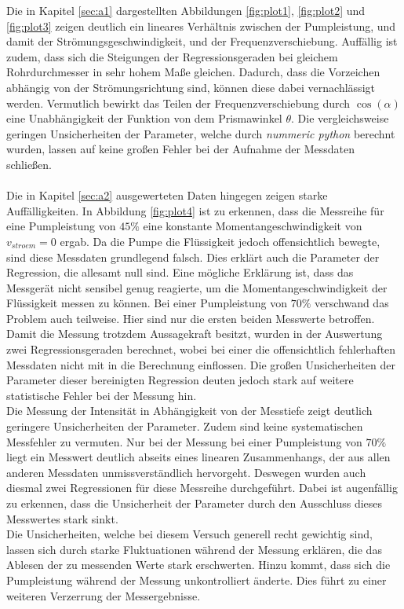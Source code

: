 Die in Kapitel \ref{sec:a1} dargestellten Abbildungen \ref{fig:plot1}, \ref{fig:plot2} und \ref{fig:plot3} zeigen deutlich ein lineares Verhältnis
zwischen der Pumpleistung, und damit der Strömungsgeschwindigkeit, und der Frequenzverschiebung. Auffällig ist zudem, dass sich die Steigungen der
Regressionsgeraden bei gleichem Rohrdurchmesser in sehr hohem Maße gleichen. Dadurch, dass die Vorzeichen abhängig von der Strömungsrichtung sind,
können diese dabei vernachlässigt werden. Vermutlich bewirkt das Teilen der Frequenzverschiebung durch $\cos(\alpha)$ eine Unabhängigkeit der
Funktion von dem Prismawinkel $\theta$. Die vergleichsweise geringen Unsicherheiten der Parameter, welche durch \textit{nummeric python} \cite{numpy}
berechnt wurden, lassen auf keine großen Fehler bei der Aufnahme der Messdaten schließen.
\\\\\noindent
Die in Kapitel \ref{sec:a2} ausgewerteten Daten hingegen zeigen starke Auffälligkeiten. In Abbildung \ref{fig:plot4} ist zu erkennen, dass die
Messreihe für eine Pumpleistung von $45\%$ eine konstante Momentangeschwindigkeit von $v_{stroem}=0$ ergab. Da die Pumpe die Flüssigkeit jedoch
offensichtlich bewegte, sind diese Messdaten grundlegend falsch. Dies erklärt auch die Parameter der Regression, die allesamt null sind. Eine
mögliche Erklärung ist, dass das Messgerät nicht sensibel genug reagierte, um die Momentangeschwindigkeit der Flüssigkeit messen zu können.
Bei einer Pumpleistung von $70\%$ verschwand das Problem auch teilweise. Hier sind nur die ersten beiden Messwerte betroffen. Damit die
Messung trotzdem Aussagekraft besitzt, wurden in der Auswertung zwei Regressionsgeraden berechnet, wobei bei einer die offensichtlich fehlerhaften
Messdaten nicht mit in die Berechnung einflossen. Die großen Unsicherheiten der Parameter dieser bereinigten Regression deuten jedoch stark auf
weitere statistische Fehler bei der Messung hin.
\\\noindent
Die Messung der Intensität in Abhängigkeit von der Messtiefe zeigt deutlich geringere Unsicherheiten der Parameter. Zudem sind keine systematischen
Messfehler zu vermuten. Nur bei der Messung bei einer Pumpleistung von $70\%$ liegt ein Messwert deutlich abseits eines linearen Zusammenhangs, der
aus allen anderen Messdaten unmissverständlich hervorgeht. Deswegen wurden auch diesmal zwei Regressionen für diese Messreihe durchgeführt. Dabei
ist augenfällig zu erkennen, dass die Unsicherheit der Parameter durch den Ausschluss dieses Messwertes stark sinkt.
\\\noindent
Die Unsicherheiten, welche bei diesem Versuch generell recht gewichtig sind, lassen sich durch starke Fluktuationen während der Messung erklären,
die das Ablesen der zu messenden Werte stark erschwerten. Hinzu kommt, dass sich die Pumpleistung während der Messung unkontrolliert änderte. Dies
führt zu einer weiteren Verzerrung der Messergebnisse.
